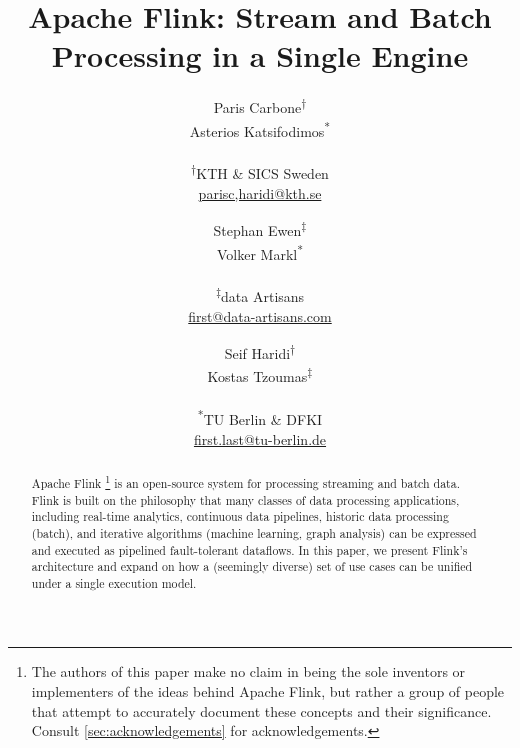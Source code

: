 \documentclass[11pt]{article}
\begin{document}
\title{Apache Flink\texttrademark: Stream and Batch Processing in a Single Engine}

\author{Paris Carbone\textsuperscript{$\dagger$} \\ Asterios Katsifodimos\textsuperscript{*} \\\\ \small{ \textsf{\small \textsuperscript{$\dagger$}KTH \& SICS Sweden}} \\ \small \href{parisc,haridi@kth.se}{parisc,haridi@kth.se}
\and Stephan Ewen\textsuperscript{$\ddagger$} \\ Volker Markl\textsuperscript{*} \\\\ \small \textsf{\textsuperscript{$\ddagger$}data Artisans} \\ \small \href{first@data-artisans.com}{first@data-artisans.com}
\and Seif Haridi\textsuperscript{$\dagger$} \\ Kostas Tzoumas\textsuperscript{$\ddagger$} \\\\ \small \textsf{\textsuperscript{*}TU Berlin \& DFKI} \\ \small \href{fist.last@tu-berlin.de}{first.last@tu-berlin.de}
%
\vspace{-5mm}
}




\maketitle

\begin{abstract}
Apache Flink \footnote{The authors of this paper make no claim in being the sole inventors or implementers of the ideas behind Apache Flink, but rather a group of people that attempt to accurately document these concepts and their significance. Consult \autoref{sec:acknowledgements} for acknowledgements.} is an open-source system for processing streaming and batch data. Flink is built on the philosophy that many classes of data processing applications, including real-time analytics, continuous data pipelines, historic data processing (batch), and iterative algorithms (machine learning, graph analysis) can be expressed and executed as pipelined fault-tolerant dataflows. In this paper, we present Flink's architecture and expand on how a (seemingly diverse) set of use cases can be unified under a single execution model.
\end{abstract}
\end{document}
